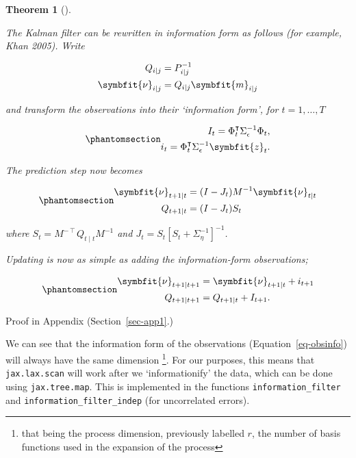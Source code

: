 \documentclass[
]{report}
\newcommand{\bv}[1]{\symbfit{#1}}
\theoremstyle{plain}
\theoremstyle{plain}
\theoremstyle{plain}
\newtheorem{theorem}{Theorem}[section]
\theoremstyle{remark}
\begin{document}
\begin{theorem}[]\protect\hypertarget{thm-information_filter}{}\label{thm-information_filter}

The Kalman filter can be rewritten in information form as follows (for
example, Khan 2005). Write

\[\begin{split}
Q_{i\mid j} &= P_{i\mid j}^{-1}\\
\bv\nu_{i\mid j} &= Q_{i\mid j} \bv m_{i\mid j}
\end{split}
\]

and transform the observations into their `information form', for
\(t=1,\dots, T\)

\begin{equation}\phantomsection\label{eq-obsinfo}{\begin{split}
I_{t} = \Phi_{t}^{\intercal} \Sigma_{\epsilon}^{-1}\Phi_{t},\\
i_{t} = \Phi_{t}^{\intercal} \Sigma_{\epsilon}^{-1} \bv z_{t}.
\end{split}
}\end{equation}

The prediction step now becomes

\begin{equation}\phantomsection\label{eq-infpred}{\begin{split}
\bv\nu_{t+1\mid t} &= (I-J_t) M^{-1}\bv\nu_{t\mid t}\\
Q_{t+1\mid t} &= (I-J_t) S_{t} 
\end{split}
}\end{equation}

where \(S_t = M^{-\intercal} Q_{t\mid t} M^{-1}\) and
\(J_t = S_t [S_{t}+\Sigma_{\eta}^{-1}]^{-1}\).

Updating is now as simple as adding the information-form observations;

\begin{equation}\phantomsection\label{eq-infupd}{\begin{split}
  \bv\nu_{t+1\mid t+1} &= \bv\nu_{t+1\mid t} + i_{t+1}\\
  Q_{t+1\mid t+1} &= Q_{t+1\mid t} + I_{t+1}.
\end{split}
}\end{equation}

\end{theorem}

Proof in Appendix (Section~\ref{sec-app1}.)

We can see that the information form of the observations
(Equation~\ref{eq-obsinfo}) will always have the same dimension
\footnote{that being the process dimension, previously labelled \(r\),
  the number of basis functions used in the expansion of the process}.
For our purposes, this means that \texttt{jax.lax.scan} will work after
we `informationify' the data, which can be done using
\texttt{jax.tree.map}. This is implemented in the functions
\texttt{information\_filter} and \texttt{information\_filter\_indep}
(for uncorrelated errors).
\end{document}

